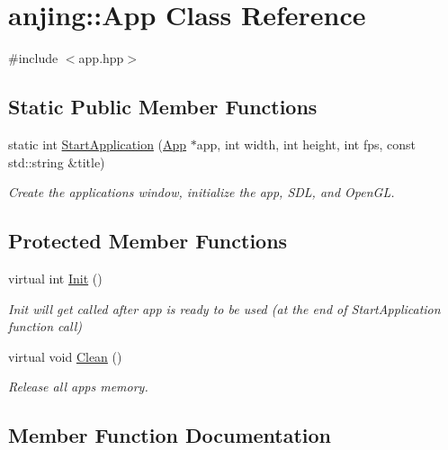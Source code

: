 \hypertarget{classanjing_1_1_app}{}\section{anjing\+:\+:App Class Reference}
\label{classanjing_1_1_app}


{\ttfamily \#include $<$app.\+hpp$>$}

\subsection*{Static Public Member Functions}
\begin{DoxyCompactItemize}
\item 
static int \hyperlink{classanjing_1_1_app_af7dd6e06068a1433dc51c6944eceb141}{Start\+Application} (\hyperlink{classanjing_1_1_app}{App} $\ast$app, int width, int height, int fps, const std\+::string \&title)
\begin{DoxyCompactList}\small\item\em Create the applications\textquotesingle{} window, initialize the app, S\+D\+L, and Open\+G\+L. \end{DoxyCompactList}\end{DoxyCompactItemize}
\subsection*{Protected Member Functions}
\begin{DoxyCompactItemize}
\item 
virtual int \hyperlink{classanjing_1_1_app_ac21568a309981fcb0beafd2c8c92cd8a}{Init} ()
\begin{DoxyCompactList}\small\item\em Init will get called after app is ready to be used (at the end of Start\+Application function call) \end{DoxyCompactList}\item 
virtual void \hyperlink{classanjing_1_1_app_abfa119eea6fe448f6c1328d66d86b2e5}{Clean} ()
\begin{DoxyCompactList}\small\item\em Release all app\textquotesingle{}s memory. \end{DoxyCompactList}\end{DoxyCompactItemize}


\subsection{Member Function Documentation}
\hypertarget{classanjing_1_1_app_abfa119eea6fe448f6c1328d66d86b2e5}{}
